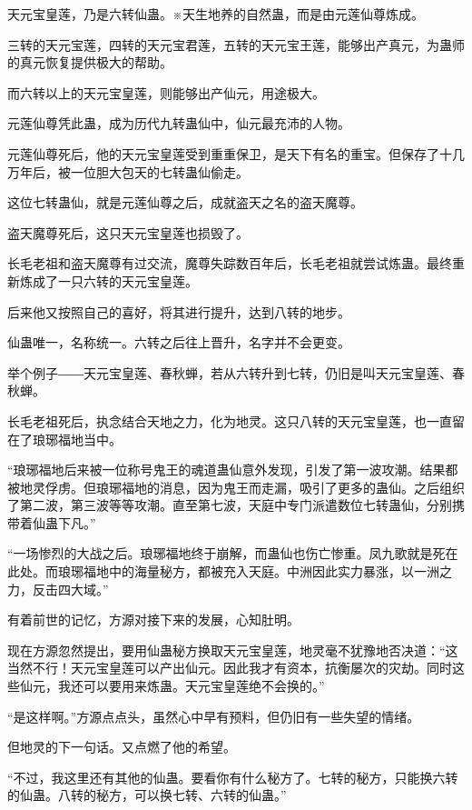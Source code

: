 
\begin{this_body}

天元宝皇莲，乃是六转仙蛊。※天生地养的自然蛊，而是由元莲仙尊炼成。

三转的天元宝莲，四转的天元宝君莲，五转的天元宝王莲，能够出产真元，为蛊师的真元恢复提供极大的帮助。

而六转以上的天元宝皇莲，则能够出产仙元，用途极大。

元莲仙尊凭此蛊，成为历代九转蛊仙中，仙元最充沛的人物。

元莲仙尊死后，他的天元宝皇莲受到重重保卫，是天下有名的重宝。但保存了十几万年后，被一位胆大包天的七转蛊仙偷走。

这位七转蛊仙，就是元莲仙尊之后，成就盗天之名的盗天魔尊。

盗天魔尊死后，这只天元宝皇莲也损毁了。

长毛老祖和盗天魔尊有过交流，魔尊失踪数百年后，长毛老祖就尝试炼蛊。最终重新炼成了一只六转的天元宝皇莲。

后来他又按照自己的喜好，将其进行提升，达到八转的地步。

仙蛊唯一，名称统一。六转之后往上晋升，名字并不会更变。

举个例子――天元宝皇莲、春秋蝉，若从六转升到七转，仍旧是叫天元宝皇莲、春秋蝉。

长毛老祖死后，执念结合天地之力，化为地灵。这只八转的天元宝皇莲，也一直留在了琅琊福地当中。

“琅琊福地后来被一位称号鬼王的魂道蛊仙意外发现，引发了第一波攻潮。结果都被地灵俘虏。但琅琊福地的消息，因为鬼王而走漏，吸引了更多的蛊仙。之后组织了第二波，第三波等等攻潮。直至第七波，天庭中专门派遣数位七转蛊仙，分别携带着仙蛊下凡。”

“一场惨烈的大战之后。琅琊福地终于崩解，而蛊仙也伤亡惨重。凤九歌就是死在此处。而琅琊福地中的海量秘方，都被充入天庭。中洲因此实力暴涨，以一洲之力，反击四大域。”

有着前世的记忆，方源对接下来的发展，心知肚明。

现在方源忽然提出，要用仙蛊秘方换取天元宝皇莲，地灵毫不犹豫地否决道：“这当然不行！天元宝皇莲可以产出仙元。因此我才有资本，抗衡屡次的灾劫。同时这些仙元，我还可以要用来炼蛊。天元宝皇莲绝不会换的。”

“是这样啊。”方源点点头，虽然心中早有预料，但仍旧有一些失望的情绪。

但地灵的下一句话。又点燃了他的希望。

“不过，我这里还有其他的仙蛊。要看你有什么秘方了。七转的秘方，只能换六转的仙蛊。八转的秘方，可以换七转、六转的仙蛊。”


\end{this_body}
